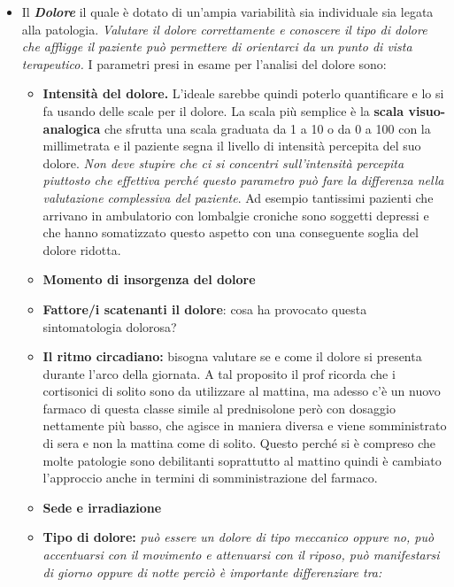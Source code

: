 \begin{itemize}
\item
  Il \textbf{\emph{Dolore}} il quale è dotato di un'ampia variabilità sia individuale sia legata alla patologia. \emph{Valutare il dolore correttamente e conoscere il tipo di dolore che affligge il paziente può permettere di orientarci da un punto di vista terapeutico.} I parametri presi in esame per l'analisi del dolore sono:

\begin{itemize}
\item
  \textbf{Intensità del dolore.} L'ideale sarebbe quindi poterlo quantificare e lo si fa usando delle scale per il dolore. La scala più semplice è la \textbf{scala visuo-analogica} che sfrutta una scala graduata da 1 a 10 o da 0 a 100 con la millimetrata e il paziente segna il livello di intensità percepita del suo dolore. \emph{Non deve stupire che ci si concentri sull'intensità percepita piuttosto che effettiva perché questo parametro può fare la differenza nella valutazione complessiva del paziente}. Ad esempio tantissimi pazienti che arrivano in ambulatorio con lombalgie croniche sono soggetti depressi e che hanno somatizzato questo aspetto con una conseguente soglia del dolore ridotta.
\item
  \textbf{Momento di insorgenza del dolore}
\item
  \textbf{Fattore/i scatenanti il dolore}: cosa ha provocato questa sintomatologia dolorosa?
\item
  \textbf{Il ritmo circadiano:} bisogna valutare se e come il dolore si presenta durante l'arco della giornata. A tal proposito il prof ricorda che i cortisonici di solito sono da utilizzare al mattina, ma adesso c'è un nuovo farmaco di questa classe simile al prednisolone però con dosaggio nettamente più basso, che agisce in maniera diversa e viene somministrato di sera e non la mattina come di solito. Questo perché si è compreso che molte patologie sono debilitanti soprattutto al mattino quindi è cambiato l'approccio anche in termini di somministrazione del farmaco.
\item
  \textbf{Sede e irradiazione}
\item
  \textbf{Tipo di dolore:} \emph{può essere un dolore di tipo meccanico oppure no, può accentuarsi con il movimento e attenuarsi con il riposo, può manifestarsi di giorno oppure di notte perciò è importante differenziare tra:}


\end{itemize}
\end{itemize}
